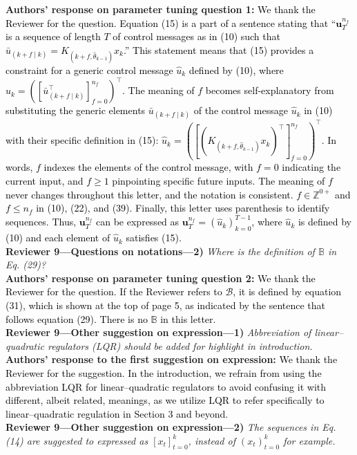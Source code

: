 \textbf{Authors' response on parameter tuning question 1:} \textcolor{black}{We thank the Reviewer for the question. Equation (15) is a part of a sentence stating that ``$\bm{u}_{T}^{n_f}$ is a sequence of length $T$ of control messages as in (10) such that $\bar{u}_{(k+f\mid k)} = K_{(k+f,\hat{\theta}_{k-1})}x_k$.'' This statement means that (15) provides a constraint for a generic control message $\hat{u}_k$ defined by (10), where $\hat{u}_k = \left([\bar{u}_{(k+f\mid k)}^{\top}]_{f=0}^{n_f}\right)^{\!\top}$. 
The meaning of $f$ becomes self-explanatory from substituting the generic elements $\bar{u}_{(k+f\mid k)}$ of the control message $\hat{u}_k$ in (10) with their specific definition in (15):
$\hat{u}_k = \left([(K_{(k+f,\hat{\theta}_{k-1})}x_k)^{\top}]_{f=0}^{n_f}\right)^{\!\top}$. In words, $f$ indexes the elements of the control message, %
with $f=0$ indicating the current input, and $f\geq 1$ pinpointing specific future inputs. The meaning of $f$ never changes throughout this letter, and the notation is consistent. 
$f \in \mathbb{Z}^{0+}$ and $f\leq n_f$ in (10), (22), and (39). Finally, this letter uses parenthesis to identify sequences. Thus, $\bm{u}_{T}^{n_f}$ can be expressed as $\bm{u}_{T}^{n_f} = (\hat{u}_k)_{k=0}^{T-1}$, where $\hat{u}_k$ is defined by (10) and each element of $\hat{u}_k$ satisfies (15). 
}\\[4mm]
\textbf{Reviewer 9—Questions on notations—2)}\textit{ %
Where is the definition of $\mathbb{B}$ in Eq. (29)?}\\[2mm]
\textbf{Authors' response on parameter tuning question 2:} \textcolor{black}{We thank the Reviewer for the question. If the Reviewer refers to $\mathcal{B}$, it is defined by equation (31), which is shown at the top of page 5, as indicated by the sentence that follows equation (29). There is no $\mathbb{B}$ in this letter.}\\[4mm]
\textbf{Reviewer 9—Other suggestion on expression—1)}\textit{ %
Abbreviation of linear–quadratic regulators (LQR) should be added for highlight in introduction.}\\[2mm]
\textbf{Authors' response to the first suggestion on expression:} \textcolor{black}{
We thank the Reviewer for the suggestion. In the introduction, we refrain from using the abbreviation LQR for linear–quadratic regulators to avoid confusing it with different, albeit related, meanings, as we utilize LQR to refer specifically to linear–quadratic regulation in Section 3 and beyond.}\\[4mm]
\textbf{Reviewer 9—Other suggestion on expression—2)}\textit{ %
The sequences in Eq. (14) are suggested to expressed as $[x_t]^k_{t=0}$, instead of $(x_t)^k_{t=0}$ for example.}\\[2mm]
